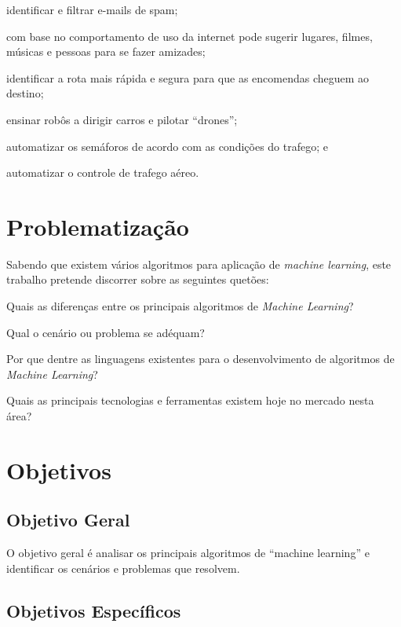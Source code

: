 	\begin{alineas}
			\item identificar e filtrar e-mails de spam;
			\item com base no comportamento de uso da internet pode sugerir lugares, filmes, músicas e pessoas para se fazer amizades;
			\item identificar a rota mais rápida e segura para que as encomendas cheguem ao destino;
			\item ensinar robôs a dirigir carros e pilotar “drones”;
			\item automatizar os semáforos de acordo com as condições do trafego; e
			\item automatizar o controle de trafego aéreo.
	\end{alineas}

\section{Problematização}
\label{sec:Problematizacao}
	Sabendo que existem vários algoritmos para aplicação de \textit{machine learning}, este trabalho pretende discorrer 
	sobre as seguintes quetões:
	\begin{alineas}    
		\item Quais as diferenças entre os principais algoritmos de \textit{Machine Learning}? 
		\item Qual o cenário ou problema se adéquam? 
		\item Por que dentre as linguagens existentes para o desenvolvimento de algoritmos de \textit{Machine Learning}?  
		\item Quais as principais tecnologias e ferramentas existem hoje no mercado nesta área?
	\end{alineas}

\section{Objetivos}
\label{sec:objetivos}
\subsection{Objetivo Geral}
\label{sec:objetivo-geral}

	O objetivo geral é analisar os principais algoritmos de “machine learning” e identificar os cenários e problemas que resolvem.


\subsection{Objetivos Específicos}
\label{sec:objetivos-especificos}

